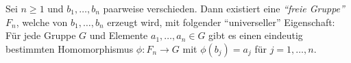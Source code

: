 \begin{theorem}
	Sei $n \geq 1$ und $b_1,\ldots,b_{n}$ paarweise verschieden. Dann existiert eine \emph{\enquote{freie Gruppe} $F_{n}$},
	welche von $b_1,\ldots,b_{n}$ erzeugt wird, mit folgender \enquote{universeller} Eigenschaft:
	Für jede Gruppe $G$ und Elemente $a_1,\ldots,a_{n} \in G$ gibt es einen eindeutig bestimmten Homomorphismus 
	$\phi: F_{n} \to G$ mit $\phi(b_{j}) = a_{j}$ für $j=1,\ldots,n$.
\end{theorem}




































